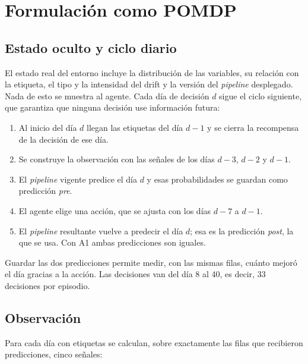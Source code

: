 \section{Formulación como POMDP}
\label{sec:met_pomdp}

\subsection{Estado oculto y ciclo diario}

El estado real del entorno incluye la distribución de las variables, su relación con la
etiqueta, el tipo y la intensidad del drift y la versión del \textit{pipeline} desplegado. Nada
de esto se muestra al agente. Cada día de decisión $d$ sigue el ciclo siguiente, que garantiza
que ninguna decisión use información futura:

\begin{enumerate}
    \item Al inicio del día $d$ llegan las etiquetas del día $d-1$ y se cierra la recompensa de la decisión de ese día.
    \item Se construye la observación con las señales de los días $d-3$, $d-2$ y $d-1$.
    \item El \textit{pipeline} vigente predice el día $d$ y esas probabilidades se guardan como predicción \textit{pre}.
    \item El agente elige una acción, que se ajusta con los días $d-7$ a $d-1$.
    \item El \textit{pipeline} resultante vuelve a predecir el día $d$; esa es la predicción \textit{post}, la que se usa. Con A1 ambas predicciones son iguales.
\end{enumerate}

Guardar las dos predicciones permite medir, con las mismas filas, cuánto mejoró el día gracias a
la acción. Las decisiones van del día 8 al 40, es decir, 33 decisiones por episodio.

\subsection{Observación}

Para cada día con etiquetas se calculan, sobre exactamente las filas que recibieron
predicciones, cinco señales:


